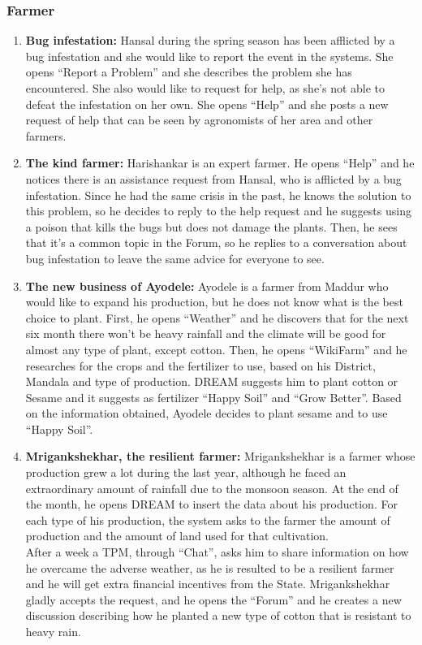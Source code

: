 \subsubsection{Farmer}
\begin{enumerate} [label=\textbf{F.\arabic*}]
    \item \textbf{Bug infestation:} Hansal during the spring season has been afflicted by a bug infestation and she would like to report the event in the systems. She opens “Report a Problem” and she describes the problem she has encountered. She also would like to request for help, as she’s not able to defeat the infestation on her own. She opens “Help” and she posts a new request of help that can be seen by agronomists of her area and other farmers.
    \item \textbf{The kind farmer: }Harishankar is an expert farmer. He opens “Help” and he notices there is an assistance request from Hansal, who is afflicted by a bug infestation. Since he had the same crisis in the past, he knows the solution to this problem, so he decides to reply to the help request and he suggests using a poison that kills the bugs but does not damage the plants. Then, he sees that it’s a common topic in the Forum, so he replies to a conversation about bug infestation to leave the same advice for everyone to see.
    \item \textbf{The new business of Ayodele: } Ayodele is a farmer from Maddur who would like to expand his production, but he does not know what is the best choice to plant. First, he opens “Weather” and he discovers that for the next six month there won’t be heavy rainfall and the climate will be good for almost any type of plant, except cotton. Then, he opens “WikiFarm” and he researches for the crops and the fertilizer to use, based on his District, Mandala and type of production. DREAM suggests him to plant cotton or Sesame and it suggests as fertilizer “Happy Soil” and “Grow Better”. Based on the information obtained, Ayodele decides to plant sesame and to use “Happy Soil”.
    \item \textbf{Mrigankshekhar, the resilient farmer: } Mrigankshekhar is a farmer whose production grew a lot during the last year, although he faced an extraordinary amount of rainfall due to the monsoon season. At the end of the month, he opens DREAM to insert the data about his production. For each type of his production, the system asks to the farmer the amount of production and the amount of land used for that cultivation. \\After a week a TPM, through “Chat”, asks him to share information on how he overcame the adverse weather, as he is resulted to be a resilient farmer and he will get extra financial incentives from the State. Mrigankshekhar gladly accepts the request, and he opens the “Forum” and he creates a new discussion describing how he planted a new type of cotton that is resistant to heavy rain.
\end{enumerate}
